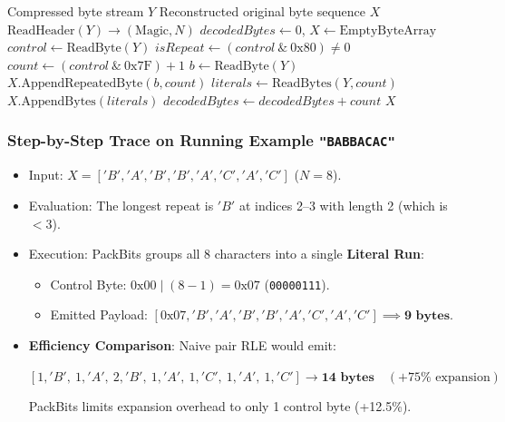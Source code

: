 \documentclass[12pt,a4paper]{article}
\begin{document}
\begin{algorithm}[H]
\caption{PackBits Flag RLE Decompression}
\begin{algorithmic}[1]
\Require Compressed byte stream $Y$
\Ensure Reconstructed original byte sequence $X$
\State $\text{ReadHeader}(Y) \to (\text{Magic}, N)$
\State $decodedBytes \gets 0$, $X \gets \text{EmptyByteArray}$
    \State $control \gets \text{ReadByte}(Y)$
    \State $isRepeat \gets (control \ \& \ 0\text{x}80) \neq 0$
    \State $count \gets (control \ \& \ 0\text{x}7\text{F}) + 1$
        \State $b \gets \text{ReadByte}(Y)$
        \State $X.\text{AppendRepeatedByte}(b, count)$
    \Else
        \State $literals \gets \text{ReadBytes}(Y, count)$
        \State $X.\text{AppendBytes}(literals)$
    \EndIf
    \State $decodedBytes \gets decodedBytes + count$
\EndWhile
\State \Return $X$
\end{algorithmic}
\end{algorithm}

\subsubsection{Step-by-Step Trace on Running Example \texttt{"BABBACAC"}}
\begin{itemize}
    \item Input: $X = ['B', 'A', 'B', 'B', 'A', 'C', 'A', 'C']$ ($N = 8$).
    \item Evaluation: The longest repeat is $'B'$ at indices 2--3 with length 2 (which is $< 3$).
    \item Execution: PackBits groups all 8 characters into a single \textbf{Literal Run}:
    \begin{itemize}
        \item Control Byte: $0\text{x}00 \mid (8 - 1) = 0\text{x}07$ (\texttt{00000111}).
        \item Emitted Payload: $[0\text{x}07, 'B', 'A', 'B', 'B', 'A', 'C', 'A', 'C'] \implies \mathbf{9\text{ bytes}}$.
    \end{itemize}
    \item \textbf{Efficiency Comparison}: Naive pair RLE would emit:
    \begin{center}
    $[1,\!'\!B\!',\ 1,\!'\!A\!',\ 2,\!'\!B\!',\ 1,\!'\!A\!',\ 1,\!'\!C\!',\ 1,\!'\!A\!',\ 1,\!'\!C\!'] \to \mathbf{14\text{ bytes}} \quad (+75\%\text{ expansion})$
    \end{center}
    \vspace{-0.5em}
    PackBits limits expansion overhead to only 1 control byte (+12.5\%).
\end{itemize}
\end{document}
